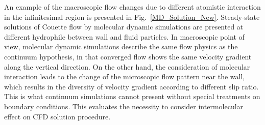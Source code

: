 \documentclass[conference,final]{IEEEtran}
\newcommand{\skonote}[1]{ {\textcolor{blue} { ***Jeff: #1 }}}
\newcommand{\skonote}[1]{}
\begin{document}
An example of the macroscopic flow changes due to different atomistic interaction in the infinitesimal region is presented in Fig.~\ref{MD_Solution_New}. Steady-state solutions of Couette flow by molecular dynamic simulations are presented at different hydrophile between wall and fluid particles. In macroscopic point of view, molecular dynamic simulations describe the same flow physics as the continuum hypothesis, in that converged flow shows the same velocity gradient along the vertical direction. On the other hand, the consideration of molecular interaction leads to the change of the microscopic flow pattern near the wall, which results in the diversity of velocity gradient according to different slip ratio. This is what continuum simulations cannot present without special treatments on boundary conditions. This evaluates the necessity to consider intermolecular effect on CFD solution procedure.
\newline
\end{document}
